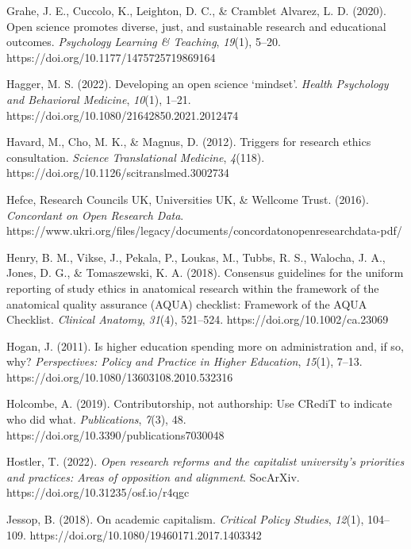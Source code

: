 \documentclass[meta, authordate]{jote-new-article}
\begin{document}
Grahe, J. E., Cuccolo, K., Leighton, D. C., & Cramblet Alvarez, L. D. (2020). Open science promotes diverse, just, and sustainable research and educational outcomes. \emph{Psychology Learning & Teaching}, \emph{19}(1), 5–20. https://doi.org/10.1177/1475725719869164



Hagger, M. S. (2022). Developing an open science ‘mindset’. \emph{Health Psychology and Behavioral Medicine}, \emph{10}(1), 1–21. https://doi.org/10.1080/21642850.2021.2012474



Havard, M., Cho, M. K., & Magnus, D. (2012). Triggers for research ethics consultation. \emph{Science Translational Medicine}, \emph{4}(118). https://doi.org/10.1126/scitranslmed.3002734



Hefce, Research Councils UK, Universities UK, & Wellcome Trust. (2016). \emph{Concordant on Open Research Data}. https://www.ukri.org/files/legacy/documents/concordatonopenresearchdata-pdf/



Henry, B. M., Vikse, J., Pekala, P., Loukas, M., Tubbs, R. S., Walocha, J. A., Jones, D. G., & Tomaszewski, K. A. (2018). Consensus guidelines for the uniform reporting of study ethics in anatomical research within the framework of the anatomical quality assurance (AQUA) checklist: Framework of the AQUA Checklist. \emph{Clinical Anatomy}, \emph{31}(4), 521–524. https://doi.org/10.1002/ca.23069



Hogan, J. (2011). Is higher education spending more on administration and, if so, why? \emph{Perspectives: Policy and Practice in Higher Education}, \emph{15}(1), 7–13. https://doi.org/10.1080/13603108.2010.532316



Holcombe, A. (2019). Contributorship, not authorship: Use CRediT to indicate who did what. \emph{Publications}, \emph{7}(3), 48. https://doi.org/10.3390/publications7030048



Hostler, T. (2022). \emph{Open research reforms and the capitalist university’s priorities and practices: Areas of opposition and alignment}. SocArXiv. https://doi.org/10.31235/osf.io/r4qgc



Jessop, B. (2018). On academic capitalism. \emph{Critical Policy Studies}, \emph{12}(1), 104–109. https://doi.org/10.1080/19460171.2017.1403342
\end{document}
